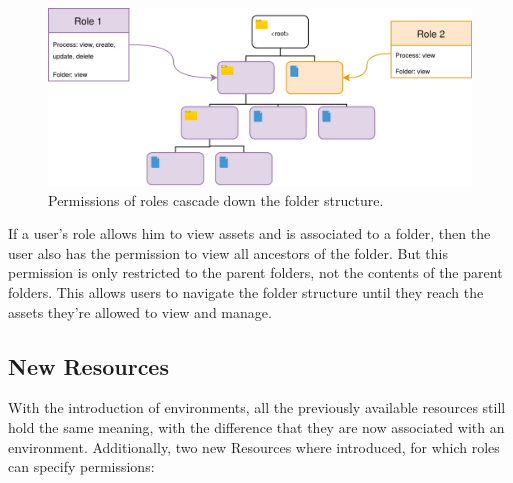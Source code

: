 \begin{figure}[H]
	\centering
	\includegraphics[scale=0.2]{./images/tree-roles.drawio.png}
	\caption{Permissions of roles cascade down the folder structure.}
\end{figure}

If a user's role allows him to view assets and is associated to a folder, then the user
also has the permission to view all ancestors of the folder.
But this permission is only restricted to the parent folders, not the contents of the parent folders.
This allows users to navigate the folder structure until they reach the assets they're
allowed to view and manage.


\subsection{New Resources}

With the introduction of environments, all the previously available resources still hold
the same meaning, with the difference that they are now associated with an environment.
Additionally, two new Resources where introduced, for which roles can specify permissions:

